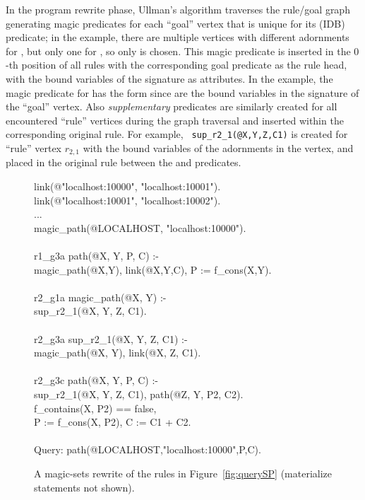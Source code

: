 In the program rewrite phase, Ullman's algorithm traverses the rule/goal
  graph generating magic predicates for each ``goal'' vertex that is
  unique for its (IDB) predicate; in the example, there are multiple vertices
  with different adornments for , but only one for ,
  so only  is chosen.  This magic predicate is inserted in
  the $0$-th position of all rules with the corresponding goal predicate
  as the rule head, with the bound variables of the signature as
  attributes. In the example, the magic predicate for  has the
  form  since  are the bound
  variables in the signature of the ``goal'' vertex.  Also
  \emph{supplementary} predicates are similarly created for all
  encountered ``rule'' vertices during the graph traversal and inserted
  within the corresponding original rule.  For example, {\tt
  sup\_r2\_1(@X,Y,Z,C1)} 
  is created for ``rule'' vertex $r_{2,1}$ with the bound variables of
  the adornments in the vertex, and placed in the original rule 
  between the  and  predicates.


\begin{figure}[!t]
\ssp
\begin{boxedminipage}{\linewidth}
link(@"localhost:10000", "localhost:10001").\\
link(@"localhost:10001", "localhost:10002").\\
...\\
magic\_path(@LOCALHOST, "localhost:10000"). \\
\\
r1\_g3a path(@X, Y, P, C) :- \\
\datalogspace magic\_path(@X,Y), link(@X,Y,C), P := f\_cons(X,Y).\\
\\
r2\_g1a magic\_path(@X, Y) :- \\
\datalogspace sup\_r2\_1(@X, Y, Z, C1). \\
\\
r2\_g3a sup\_r2\_1(@X, Y, Z, C1) :- \\
\datalogspace magic\_path(@X, Y), link(@X, Z, C1). \\
\\
r2\_g3c path(@X, Y, P, C) :- \\
\datalogspace sup\_r2\_1(@X, Y, Z, C1), path(@Z, Y, P2, C2). \\
\datalogspace f\_contains(X, P2) == false, \\
\datalogspace P := f\_cons(X, P2), C := C1 + C2. \\
\\
Query: path(@LOCALHOST,"localhost:10000",P,C).
\end{boxedminipage}
\caption{\label{fig:magicSP}A magic-sets rewrite of
      the rules in Figure~\ref{fig:querySP} (materialize statements not shown).}
\end{figure}


